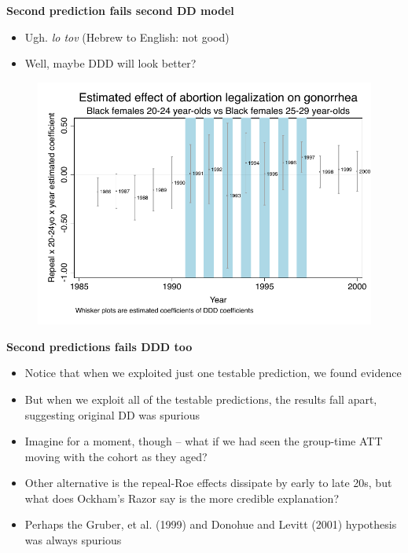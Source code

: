 \documentclass[notes=show]{beamer}
\begin{document}
\begin{frame}[plain]
\begin{center}
\textbf{Second prediction fails second DD model}
\end{center}


\begin{itemize}

\item Ugh.  \emph{lo tov} (Hebrew to English: not good)
\item Well, maybe DDD will look better?

\end{itemize}

\end{frame}


\begin{frame}[plain]

	\begin{figure}
	\includegraphics[scale=0.7]{./lecture_includes/bf20_ddd.pdf}
	\end{figure}

\end{frame}

\begin{frame}[plain]
\begin{center}
\textbf{Second predictions fails DDD too}
\end{center}

\begin{itemize}
\item Notice that when we exploited just one testable prediction, we found evidence
\item But when we exploit all of the testable predictions, the results fall apart, suggesting original DD was spurious 
\item Imagine for a moment, though -- what if we had seen the group-time ATT moving with the cohort as they aged?
\item Other alternative is the repeal-Roe effects dissipate by early to late 20s, but what does Ockham's Razor say is the more credible explanation?
\item Perhaps the Gruber, et al. (1999) and Donohue and Levitt (2001) hypothesis was always spurious
\end{itemize}

\end{frame}
\end{document}
